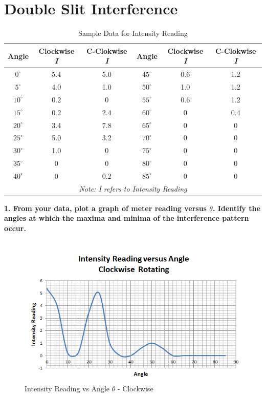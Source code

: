 \documentclass[a4paper,12pt]{report}
\begin{document}
\section{Double Slit Interference}
\begin{table}[h]
	\begin{center}
\begin{tabular}{|c|c|c||c|c|c|}
	\hline Angle & Clockwise \textit{I} & C-Clokwise \textit{I} & Angle & Clockwise \textit{I} & C-Clokwise \textit{I} \\ 
	\hline $0^{\circ}$ & 5.4 & 5.0 & $45^{\circ}$ & 0.6 & 1.2 \\ 
	 $5^{\circ}$ & 4.0 & 1.0 & $50^{\circ}$ & 1.0 & 1.2 \\ 
	 $10^{\circ}$ & 0.2 & 0 & $55^{\circ}$ & 0.6 & 1.2 \\ 
	 $15^{\circ}$ & 0.2 & 2.4 & $60^{\circ}$ & 0 & 0.4 \\ 
	 $20^{\circ}$ & 3.4 & 7.8 & $65^{\circ}$ & 0 & 0 \\ 
	 $25^{\circ}$ & 5.0 & 3.2 & $70^{\circ}$ & 0 & 0 \\ 
	 $30^{\circ}$ & 1.0 & 0 & $75^{\circ}$ & 0 & 0 \\ 
	 $35^{\circ}$ & 0 & 0 & $80^{\circ}$ & 0 & 0 \\ 
	 $40^{\circ}$ & 0 & 0.2 & $85^{\circ}$ & 0 & 0 \\ 
	\hline
	\multicolumn{6}{|c|}{\textit{Note: I refers to Intensity Reading }} \\
	\hline 
\end{tabular} 
\end{center}
\caption{Sample Data for Intensity Reading}
\end{table}
\textbf{1. From your data, plot a graph of meter reading versus $\theta$. Identify the angles at which the maxima and minima of the interference pattern occur.}\\\\
\begin{figure}[!h]
\centering
\includegraphics[width=1.0\linewidth, height=0.42\textheight]{clock}
\caption{Intensity Reading vs Angle $\theta$ - Clockwise}
\label{fig:clock}
\end{figure}
\end{document}
